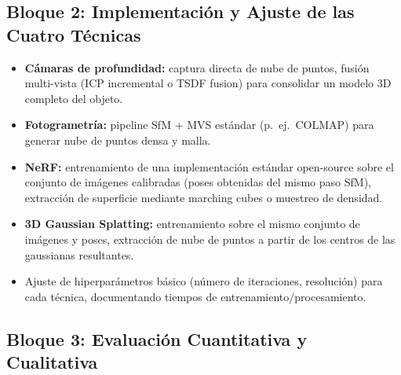 \documentclass[11pt]{article}
\begin{document}
\subsection{Bloque 2: Implementaci\'on y Ajuste de las Cuatro T\'ecnicas}

\begin{itemize}
    \item \textbf{C\'amaras de profundidad:} captura directa de nube de puntos, fusi\'on multi-vista (ICP incremental o TSDF fusion) para consolidar un modelo 3D completo del objeto.
    \item \textbf{Fotogrametr\'ia:} pipeline SfM + MVS est\'andar (p.\ ej.\ COLMAP) para generar nube de puntos densa y malla.
    \item \textbf{NeRF:} entrenamiento de una implementaci\'on est\'andar open-source sobre el conjunto de im\'agenes calibradas (poses obtenidas del mismo paso SfM), extracci\'on de superficie mediante marching cubes o muestreo de densidad.
    \item \textbf{3D Gaussian Splatting:} entrenamiento sobre el mismo conjunto de im\'agenes y poses, extracci\'on de nube de puntos a partir de los centros de las gaussianas resultantes.
    \item Ajuste de hiperpar\'ametros b\'asico (n\'umero de iteraciones, resoluci\'on) para cada t\'ecnica, documentando tiempos de entrenamiento/procesamiento.
\end{itemize}

\subsection{Bloque 3: Evaluaci\'on Cuantitativa y Cualitativa}
\end{document}
